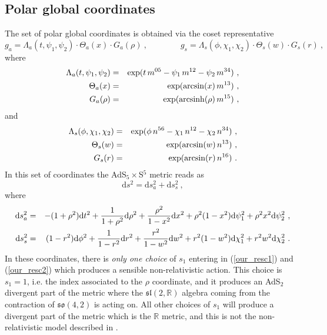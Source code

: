 \documentclass[12pt]{article}
\def\dd{\text{d}}
\DeclareMathOperator\arcsinh{arcsinh}
\numberwithin{equation}{section}
\begin{document}
\begin{appendices}
\subsection{Polar global coordinates}
The set of polar global coordinates is obtained via the coset representative
\begin{equation}
g_a = \Lambda_a(t, \psi_1, \psi_2) \cdot \Theta_a(x) \cdot G_a(\rho) \ , \qquad\qquad
g_s = \Lambda_s(\phi,  \chi_1, \chi_2) \cdot \Theta_s(w) \cdot G_s(r) \ , 
\end{equation} 
where
\begin{eqnarray}
\notag
\Lambda_a(t, \psi_1, \psi_2)&=& \exp ( t \, m^{05} - \psi_1 \, m^{12} - \psi_2 \, m^{34} ) \ ,  \\
\notag
\Theta_a(x)&=& \exp ( \arcsin (x) \, m^{13} ) \ ,  \\
G_a(\rho) &=& \exp ( \arcsinh (\rho) \, m^{15} ) \ ,
\end{eqnarray}
and
\begin{eqnarray}
\notag
\Lambda_s(\phi,  \chi_1, \chi_2)&=& \exp ( \phi \, n^{56} - \chi_1 \, n^{12} - \chi_2 \, n^{34} ) \ ,  \\
\notag
\Theta_s(w)&=& \exp ( \arcsin (w) \, n^{13} ) \ ,  \\
G_s(r) &=& \exp ( \arcsin (r) \, n^{16} ) \ .
\end{eqnarray} 
In this set of coordinates the AdS$_5\times$S$^5$ metric reads as
\begin{equation}
\dd s^2 = \dd s^2_a + \dd s^2_s \ , 
\end{equation}  
where
\begin{eqnarray}
\notag
\dd s^2_a &=& -(1+ \rho^2) \dd t^2 + \frac{1}{1+ \rho^2} \dd \rho^2 +\frac{\rho^2}{1-x^2} \dd x^2+ \rho^2(1- x^2) \dd \psi_1^2 + \rho^2x^2  \dd \psi_2^2 \ , \\
\dd s^2_s &=& (1-r^2) \dd \phi^2 + \frac{1}{1-r^2} \dd r^2 + \frac{r^2}{1-w^2} \dd w^2 + r^2(1-w^2) \dd \chi_1^2 + r^2w^2 \dd \chi_2^2 \ .
\end{eqnarray}
In these coordinates, there is \emph{only one choice} of $s_1$ entering in (\ref{our_resc1}) and (\ref{our_resc2}) which produces a sensible non-relativistic action.  This choice is $s_1 = 1$, i.e. the index associated to the $\rho$ coordinate, and it produces an AdS$_2$ divergent part of the metric where the $\mathfrak{sl}(2, \mathbb{R})$ algebra coming from the contraction of $\mathfrak{so}(4,2)$ is acting on.  All other choices of $s_1$ will produce a divergent part of the metric which is the $\mathbb{R}$ metric, and this is not the non-relativistic model described in \cite{Gomis:2005pg}. 


\end{appendices}
\end{document}
